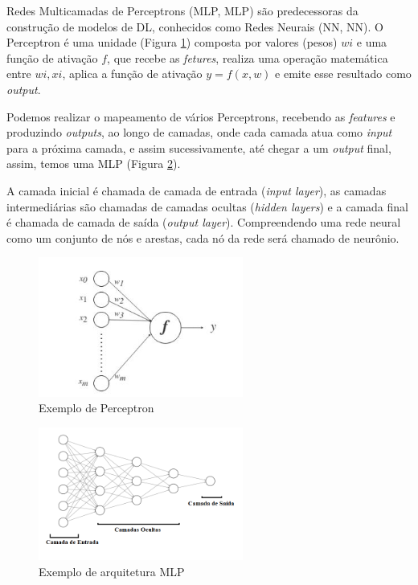 Redes Multicamadas de Perceptrons (\acrlong{MLP}, \acrshort{MLP}) são predecessoras da construção de modelos de \acrshort{DL}, conhecidos como Redes Neurais (\acrlong{NN}, \acrshort{NN}). O Perceptron é uma unidade (Figura \ref{fig:perceptron}) composta por valores (pesos) $wi$ e uma função de ativação $f$,  que recebe as \textit{fetures}, realiza uma operação matemática entre $wi,xi$, aplica a função de ativação $y = f(x,w)$ e emite esse resultado como \textit{output}.

Podemos realizar o mapeamento de vários Perceptrons, recebendo as \textit{features} e produzindo \textit{outputs}, ao longo de camadas, onde cada camada atua como \textit{input} para a próxima camada, e assim sucessivamente, até chegar a
 um \textit{output} final, assim, temos uma \acrshort{MLP} (Figura \ref{fig:mlp}).
 
 
 A camada inicial é chamada de camada de entrada (\textit{input layer}), as camadas intermediárias são chamadas de camadas ocultas (\textit{hidden layers}) e a camada final é chamada de camada de saída (\textit{output layer}). Compreendendo uma rede neural como um conjunto de nós e arestas, cada nó da rede será chamado de neurônio.

\begin{figure}[!ht]
\centering
\includegraphics[width=0.6\textwidth]{img/perceptron.png}
\caption{\label{fig:perceptron}Exemplo de Perceptron}
\author{Fonte: Retirado de~\cite{12}}
\end{figure}

\begin{figure}[!h]
\centering
\includegraphics[width=0.6\textwidth]{img/mlp03.png}
\caption{\label{fig:mlp}Exemplo de arquitetura \acrshort{MLP}}

\end{figure}

